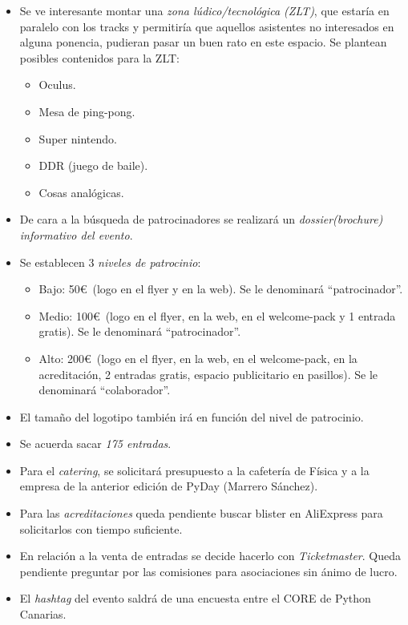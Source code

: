 \documentclass[a4paper, 12pt]{article}
\begin{document}
\begin{itemize}
    \item Se ve interesante montar una \textit{zona lúdico/tecnológica (ZLT)}, que estaría en paralelo con los tracks y permitiría que aquellos asistentes no interesados en alguna ponencia, pudieran pasar un buen rato en este espacio. Se plantean posibles contenidos para la ZLT:
    \begin{itemize}
        \item Oculus.
        \item Mesa de ping-pong.
        \item Super nintendo.
        \item DDR (juego de baile).
        \item Cosas analógicas.
    \end{itemize}
    \item De cara a la búsqueda de patrocinadores se realizará un \textit{dossier(brochure) informativo del evento}.
    \item Se establecen 3 \textit{niveles de patrocinio}:
    \begin{itemize}
        \item Bajo: 50\euro\ (logo en el flyer y en la web). Se le denominará ``patrocinador''.
        \item Medio: 100\euro\ (logo en el flyer, en la web, en el welcome-pack y 1 entrada gratis). Se le denominará ``patrocinador''.
        \item Alto: 200\euro\ (logo en el flyer, en la web, en el welcome-pack, en la acreditación, 2 entradas gratis, espacio publicitario en pasillos). Se le denominará ``colaborador''.
    \end{itemize}
    \item El tamaño del logotipo también irá en función del nivel de patrocinio.
    \item Se acuerda sacar \textit{175 entradas}.
    \item Para el \textit{catering}, se solicitará presupuesto a la cafetería de Física y a la empresa de la anterior edición de PyDay (Marrero Sánchez).
    \item Para las \textit{acreditaciones} queda pendiente buscar blister en AliExpress para solicitarlos con tiempo suficiente.
    \item En relación a la venta de entradas se decide hacerlo con \textit{Ticketmaster}. Queda pendiente preguntar por las comisiones para asociaciones sin ánimo de lucro.
    \item El \textit{hashtag} del evento saldrá de una encuesta entre el CORE de Python Canarias.

\end{itemize}
\end{document}
